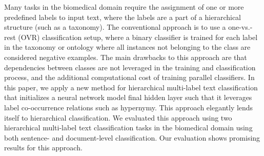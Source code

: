 Many tasks in the biomedical domain require the assignment of one or more predefined labels to input text, where the labels are a part of a hierarchical structure (such as a taxonomy). The conventional approach is to use a one-vs.-rest (OVR) classification setup, where a binary classifier is trained for each label in the taxonomy or ontology where all instances not belonging to the class are considered negative examples. The main drawbacks to this approach are that dependencies between classes are not leveraged in the training and classification process, and the additional computational cost of training parallel classifiers. In this paper, we apply a new method for hierarchical multi-label text classification that initializes a neural network model final hidden layer such that it leverages label co-occurrence relations such as hypernymy. This approach elegantly lends itself to hierarchical classification. We evaluated this approach using two hierarchical multi-label text classification tasks in the biomedical domain using both sentence- and document-level classification. Our evaluation shows promising results for this approach.
